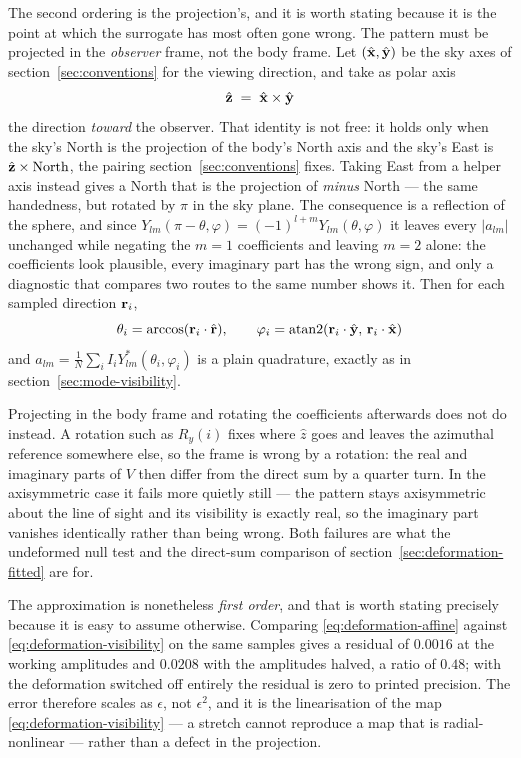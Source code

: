 The second ordering is the projection's, and it is worth stating because it is the point at
which the surrogate has most often gone wrong.  The pattern must be projected in the
\emph{observer} frame, not the body frame.  Let $(\hat{\mathbf x},\hat{\mathbf y})$ be the sky axes
of section~\ref{sec:conventions} for the viewing direction, and take as polar axis
\begin{equation}
  \hat{\mathbf z} \;=\; \hat{\mathbf x} \times \hat{\mathbf y}
  \label{eq:observer-polar-axis}
\end{equation}
the direction \emph{toward} the observer.  That identity is not free: it holds only when the
sky's North is the projection of the body's North axis and the sky's East is
$\hat{\mathbf z}\times\text{North}$, the pairing section~\ref{sec:conventions} fixes.  Taking
East from a helper axis instead gives a North that is the projection of \emph{minus} North ---
the same handedness, but rotated by $\pi$ in the sky plane.  The consequence is a reflection of
the sphere, and since $Y_{lm}(\pi-\theta,\varphi) = (-1)^{l+m}Y_{lm}(\theta,\varphi)$ it leaves
every $|a_{lm}|$ unchanged while negating the $m = 1$ coefficients and leaving $m = 2$ alone:
the coefficients look plausible, every imaginary part has the wrong sign, and only a
diagnostic that compares two routes to the same number shows it.  Then
for each sampled direction ${\mathbf r}_i$,
\begin{equation}
  \theta_i = \arccos({\mathbf r}_i\cdot\hat{\mathbf r}) , \qquad
  \varphi_i = \operatorname{atan2}({\mathbf r}_i\cdot\hat{\mathbf y},\, {\mathbf r}_i\cdot\hat{\mathbf x})
  \label{eq:observer-angles}
\end{equation}
and $a_{lm} = \frac{1}{N}\sum_i I_i Y_{lm}^*(\theta_i,\varphi_i)$ is a plain
quadrature, exactly as in section~\ref{sec:mode-visibility}.

Projecting in the body frame and rotating the coefficients afterwards does not do instead.
A rotation such as $R_y(i)$ fixes where $\hat z$ goes and leaves the azimuthal reference
somewhere else, so the frame is wrong by a rotation: the real and imaginary parts of $V$
then differ from the direct sum by a quarter turn.  In the axisymmetric case it fails more
quietly still --- the pattern stays axisymmetric about the line of sight and its visibility
is exactly real, so the imaginary part vanishes identically rather than being wrong.  Both
failures are what the undeformed null test and the direct-sum comparison of
section~\ref{sec:deformation-fitted} are for.

The approximation is nonetheless \emph{first order}, and that is worth stating precisely
because it is easy to assume otherwise.  Comparing \eqref{eq:deformation-affine} against
\eqref{eq:deformation-visibility} on the same samples gives a residual of $0.0016$ at the
working amplitudes and $0.0208$ with the amplitudes halved, a ratio of $0.48$; with the
deformation switched off entirely the residual is zero to printed precision.  The error
therefore scales as $\epsilon$, not $\epsilon^2$, and it is the linearisation of the map
\eqref{eq:deformation-visibility} --- a stretch cannot reproduce a map that is
radial-nonlinear --- rather than a defect in the projection.

